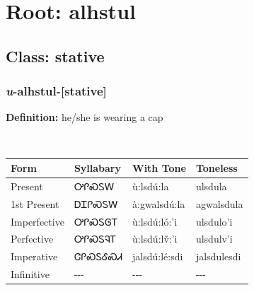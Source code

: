 \needspace{4in}
\section*{Root: alhstul}
\nopagebreak
{}
\needspace{3in}
\subsection*{Class: stative}
\nopagebreak
\needspace{2in}
\subsubsection*{\textit{u}{-}\textbf{alhstul}{-}[stative]}
\nopagebreak
\textbf{Definition: } he/she is wearing a cap
\\[0.5em]
\begin{tabularx}{\textwidth}{l X X X}%
\toprule%
\textbf{Form}&\textbf{Syllabary}&\textbf{With Tone}&\textbf{Toneless}\\%
\midrule%
Present&ᎤᎵᏍᏚᎳ&ù:lsdú:la&ulsdula\\%
1st Present&ᎠᏆᎵᏍᏚᎳ&à:gwalsdú:la&agwalsdula\\%
Imperfective&ᎤᎵᏍᏚᎶᎢ&ù:lsdú:ló:’i&ulsdulo’i\\%
Perfective&ᎤᎵᏍᏚᎸᎢ&ù:lsdú:lv̌:’i&ulsdulv’i\\%
Imperative&ᏣᎵᏍᏚᎴᏍᏗ&jalsdú:lé:sdi&jalsdulesdi\\%
Infinitive&{-}{-}{-}&{-}{-}{-}&{-}{-}{-}\\%
\bottomrule%
\end{tabularx}
\\[1em]